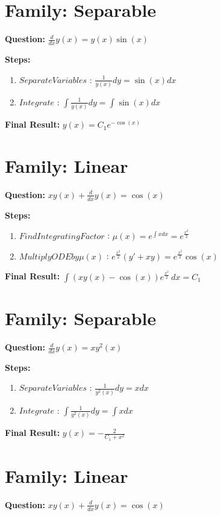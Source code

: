 \documentclass{article}
\begin{document}
\section*{Family: Separable}
\textbf{Question:} $\frac{d}{d x} y{\left(x \right)} = y{\left(x \right)} \sin{\left(x \right)}$

\textbf{Steps:}
\begin{enumerate}
\item $Separate Variables$ :  $\frac{1}{y{\left(x \right)}} dy = \sin{\left(x \right)} dx$
\item $Integrate$ :  $\int \frac{1}{y{\left(x \right)}} dy = \int \sin{\left(x \right)} dx$
\end{enumerate}
\textbf{Final Result:} $y{\left(x \right)} = C_{1} e^{- \cos{\left(x \right)}}$

\section*{Family: Linear}
\textbf{Question:} $x y{\left(x \right)} + \frac{d}{d x} y{\left(x \right)} = \cos{\left(x \right)}$

\textbf{Steps:}
\begin{enumerate}
\item $Find Integrating Factor$ :  $\mu(x) = e^{\int x dx} = e^{\frac{x^{2}}{2}}$
\item $Multiply ODE by \mu(x)$ :  $e^{\frac{x^{2}}{2}}(y' + xy) = e^{\frac{x^{2}}{2}} \cos{\left(x \right)}$
\end{enumerate}
\textbf{Final Result:} $\int \left(x y{\left(x \right)} - \cos{\left(x \right)}\right) e^{\frac{x^{2}}{2}}\, dx = C_{1}$

\section*{Family: Separable}
\textbf{Question:} $\frac{d}{d x} y{\left(x \right)} = x y^{2}{\left(x \right)}$

\textbf{Steps:}
\begin{enumerate}
\item $Separate Variables$ :  $\frac{1}{y^{2}{\left(x \right)}} dy = x dx$
\item $Integrate$ :  $\int \frac{1}{y^{2}{\left(x \right)}} dy = \int x dx$
\end{enumerate}
\textbf{Final Result:} $y{\left(x \right)} = - \frac{2}{C_{1} + x^{2}}$

\section*{Family: Linear}
\textbf{Question:} $x y{\left(x \right)} + \frac{d}{d x} y{\left(x \right)} = \cos{\left(x \right)}$
\end{document}
